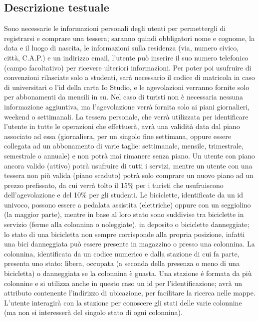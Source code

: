 \documentclass[a4paper,twoside]{article}
\begin{document}
\subsection{Descrizione testuale}
Sono necessarie le informazioni personali degli utenti per permettergli di registrarsi e comprare una tessera; saranno quindi obbligatori nome e cognome, la data e il luogo di nascita, le informazioni sulla residenza (via, numero civico, città, C.A.P.) e un indirizzo email, l'utente può inserire il suo numero telefonico (campo facoltativo) per ricevere ulteriori informazioni.\newline
Per poter poi usufruire di convenzioni rilasciate solo a studenti, sarà necessario il codice di matricola in caso di universitari o l'id della carta Io Studio, e le agevolazioni verranno fornite solo per abbonamenti da mensili in su.\newline
Nel caso di turisti non è necessaria nessuna informazione aggiuntiva, ma l'agevolazione verrà fornita solo ai piani giornalieri, weekend o settimanali.\newline
La tessera personale, che verrà utilizzata per identificare l'utente in tutte le operazioni che effettuerà, avrà una validità data dal piano associato ad essa (giornaliera, per un singolo fine settimana, oppure essere collegata ad un abbonamento di varie taglie: settimanale, mensile, trimestrale, semestrale o annuale) e non potrà mai rimanere senza piano.\newline 
Un utente con piano ancora valido (attivo) potrà usufruire di tutti i servizi, mentre un utente con una tessera non più valida (piano scaduto) potrà solo comprare un nuovo piano ad un prezzo prefissato, da cui verrà tolto il 15\% per i turisti che usufruiscono dell'agevolazione e del 10\% per gli studenti.\newline
Le biciclette, identificate da un id univoco, possono essere a pedalata assistita (elettriche) oppure con un seggiolino (la maggior parte), mentre in base al loro stato sono suddivise tra biciclette in servizio (ferme alla colonnina o noleggiate), in deposito o biciclette danneggiate; lo stato di una bicicletta non sempre corrisponde alla propria posizione, infatti una bici danneggiata può  essere presente in magazzino o presso una colonnina.\newline
La  colonnina, identificata da un codice numerico e dalla stazione di cui fa parte, presenta uno stato: libera, occupata (a seconda della presenza o meno di una bicicletta) o danneggiata se la colonnina è guasta.\newline
Una stazione é formata da più colonnine e si utilizza anche in questo caso un id per l'identificazione; avrà un attributo contenente l'indirizzo di ubicazione, per facilitare la ricerca nelle mappe. L'utente interagirà con la stazione per conoscere gli stati delle varie colonnine (ma non si interesserà del singolo stato di ogni colonnina).
\end{document}
